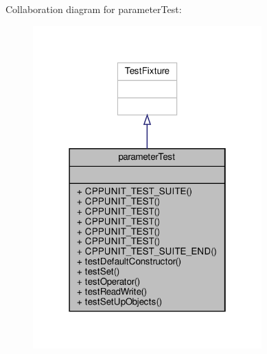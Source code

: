 Collaboration diagram for parameter\+Test\+:\nopagebreak
\begin{figure}[H]
\begin{center}
\leavevmode
\includegraphics[width=250pt]{classparameterTest__coll__graph}
\end{center}
\end{figure}
